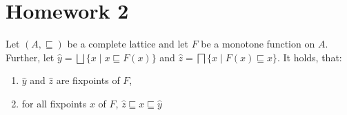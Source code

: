 \section{Homework 2}

\begin{theorem}
\label{thrm:knaster}
    Let $(A,\sqsubseteq)$ be a complete lattice and let $F$ be a monotone function on $A$.
    Further, let $\hat{y} = \bigsqcup \{x \mid x \sqsubseteq F(x)\}$ and $\hat{z} = \bigsqcap\{x \mid F(x) \sqsubseteq x\}$.
    It holds, that:
    \begin{enumerate}
      \item $\hat{y}$ and $\hat{z}$ are fixpoints of $F$,
      \item for all fixpoints $x$ of $F$, $\hat{z} \sqsubseteq x \sqsubseteq \hat{y}$
    \end{enumerate}
\end{theorem}

